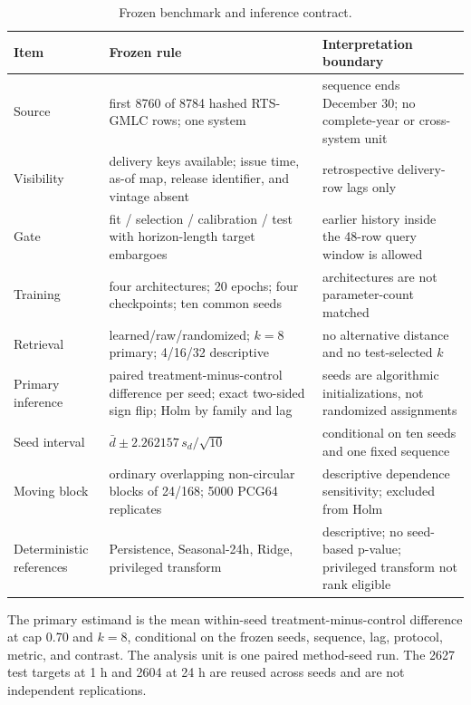 \documentclass{ieeeaccess}
\begin{document}
\begin{table}[t]
\centering
\footnotesize
\setlength{\tabcolsep}{3pt}
\caption{Frozen benchmark and inference contract.}\label{tab:2}
\begin{tabularx}{\textwidth}{@{}>{\raggedright\arraybackslash}X >{\raggedright\arraybackslash}X >{\raggedright\arraybackslash}X@{}}
\toprule
Item & Frozen rule & Interpretation boundary \\
\midrule
Source & first 8760 of 8784 hashed RTS-GMLC rows; one system & sequence ends December 30; no complete-year or cross-system unit \\
Visibility & delivery keys available; issue time, as-of map, release identifier, and vintage absent & retrospective delivery-row lags only \\
Gate & fit / selection / calibration / test with horizon-length target embargoes & earlier history inside the 48-row query window is allowed \\
Training & four architectures; 20 epochs; four checkpoints; ten common seeds & architectures are not parameter-count matched \\
Retrieval & learned/raw/randomized; $k=8$ primary; 4/16/32 descriptive & no alternative distance and no test-selected $k$ \\
Primary inference & paired treatment-minus-control difference per seed; exact two-sided sign flip; Holm by family and lag & seeds are algorithmic initializations, not randomized assignments \\
Seed interval & $\bar d\pm2.262157\,s_d/\sqrt{10}$ & conditional on ten seeds and one fixed sequence \\
Moving block & ordinary overlapping non-circular blocks of 24/168; 5000 PCG64 replicates & descriptive dependence sensitivity; excluded from Holm \\
Deterministic references & Persistence, Seasonal-24h, Ridge, privileged transform & descriptive; no seed-based p-value; privileged transform not rank eligible \\
\bottomrule
\end{tabularx}
\end{table}

The primary estimand is the mean within-seed treatment-minus-control difference at cap 0.70 and \(k=8\), conditional on the frozen seeds, sequence, lag, protocol, metric, and contrast. The analysis unit is one paired method-seed run. The 2627 test targets at 1 h and 2604 at 24 h are reused across seeds and are not independent replications.
\end{document}
